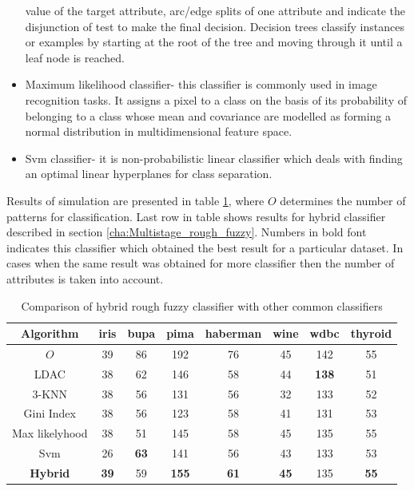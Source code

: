 \begin{itemize}
        value of the target attribute, arc/edge splits of one attribute and
        indicate the disjunction of test to make the final decision. 
        Decision trees classify instances or examples by starting at the root 
        of the tree and moving through it until a leaf node is reached.
    \item Maximum likelihood classifier- this classifier is commonly used in
        image recognition tasks. It assigns a pixel to a class on the basis of
        its probability of belonging to a class whose mean and covariance are
        modelled as forming a normal distribution in multidimensional feature
        space.
    \item Svm classifier- it is non-probabilistic linear classifier which 
        deals with finding an optimal linear hyperplanes for class separation.
\end{itemize}
Results of simulation are presented in table \ref{tab:final_comparison}, where
$O$ determines the number of patterns for classification. Last row in table
shows results for hybrid classifier described in section
\ref{cha:Multistage_rough_fuzzy}. Numbers in bold font indicates this
classifier which obtained the best result for a particular dataset. In cases
when the same result was obtained for more classifier then the number of
attributes is taken into account.

\begin{table}[H]
    \caption{Comparison of hybrid rough fuzzy classifier with other common
    classifiers}
    \centering
    \begin{tabular}{|c|c|c|c|c|c|c|c|}
        \hline
        Algorithm&iris&bupa&pima&haberman&wine&wdbc&thyroid \\ \hline \hline
        $O$&39&86&192&76&45 & 142 & 55\\ \hline
        LDAC&38&62&146&58&44& \textbf{138} &51 \\ \hline
        3-KNN&38&56&131&56&32 & 133 &52 \\ \hline
        Gini Index&38&56&123&58&41& 131 &53 \\ \hline
        Max likelyhood&38&51&145&58&45 & 135 &55\\ \hline 
        Svm&26&\textbf{63}&141&56&43& 133 & 53\\ \hline \hline
        \textbf{Hybrid}&\textbf{39}&59&\textbf{155}&\textbf{61}&\textbf{45}&
        135 & \textbf{55}\\ \hline
    \end{tabular}
    \label{tab:final_comparison}
\end{table}

